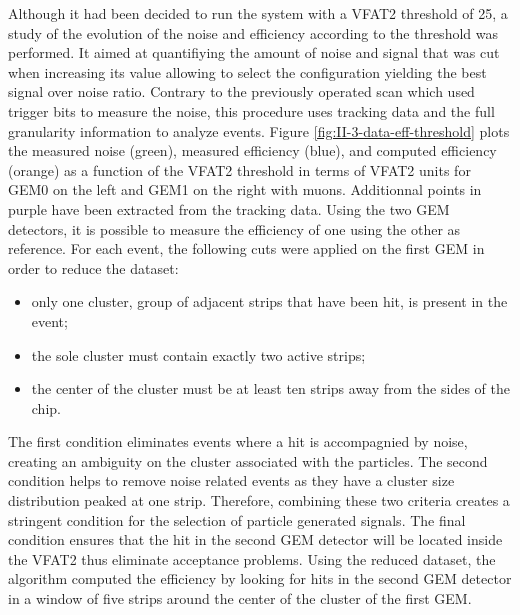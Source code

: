       Although it had been decided to run the system with a VFAT2 threshold of 25, a study of the evolution of the noise and efficiency according to the threshold was performed. It aimed at quantifiying the amount of noise and signal that was cut when increasing its value allowing to select the configuration yielding the best signal over noise ratio. Contrary to the previously operated scan which used trigger bits to measure the noise, this procedure uses tracking data and the full granularity information to analyze events. Figure \ref{fig:II-3-data-eff-threshold} plots the measured noise (green), measured efficiency (blue), and computed efficiency (orange) as a function of the VFAT2 threshold in terms of VFAT2 units for GEM0 on the left and GEM1 on the right with muons. Additionnal points in purple have been extracted from the tracking data. Using the two GEM detectors, it is possible to measure the efficiency of one using the other as reference. For each event, the following cuts were applied on the first GEM in order to reduce the dataset:
      \begin{itemize}
        \item only one cluster, group of adjacent strips that have been hit, is present in the event;
        \item the sole cluster must contain exactly two active strips;
        \item the center of the cluster must be at least ten strips away from the sides of the chip.
      \end{itemize}
      The first condition eliminates events where a hit is accompagnied by noise, creating an ambiguity on the cluster associated with the particles. The second condition helps to remove noise related events as they have a cluster size distribution peaked at one strip. Therefore, combining these two criteria creates a stringent condition for the selection of particle generated signals. The final condition ensures that the hit in the second GEM detector will be located inside the VFAT2 thus eliminate acceptance problems. Using the reduced dataset, the algorithm computed the efficiency by looking for hits in the second GEM detector in a window of five strips around the center of the cluster of the first GEM. \\

